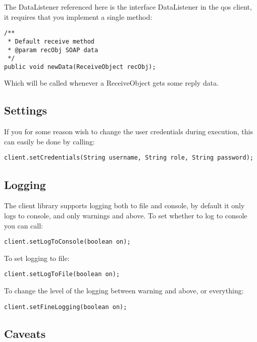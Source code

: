 The DataListener referenced here is the interface DataListener in the qos client, it requires that you implement a single method:

\begin{lstlisting}[caption={The DataListener interface}, label=userguideDatalistener]
/**
 * Default receive method
 * @param recObj SOAP data
 */
public void newData(ReceiveObject recObj);
\end{lstlisting}

Which will be called whenever a ReceiveObject gets some reply data.

\subsection{Settings}\label{userguideSettings}
If you for some reason wish to change the user credentials during execution, this can easily be done by calling:
\begin{lstlisting}[caption={Changing user credentials}, label=userguideCredentials]
    client.setCredentials(String username, String role, String password);
\end{lstlisting}

\subsection{Logging}\label{userguideLogging}
The client library supports logging both to file and console, by default it only logs to console, and only warnings and above.
To set whether to log to console you can call:
\begin{lstlisting}[caption={Turn logging to console on or off}, label=userguideTogglelogtoconsole]
    client.setLogToConsole(boolean on);
\end{lstlisting}
To set logging to file:
\begin{lstlisting}[caption={Turn logging to file on or off}, label=userguideTogglelogtofile]
    client.setLogToFile(boolean on);
\end{lstlisting}
To change the level of the logging between warning and above, or everything:
\begin{lstlisting}[caption={Switch between the two logging scopes}, label=userguideToggleloggingdetails]
    client.setFineLogging(boolean on);
\end{lstlisting}

\subsection{Caveats}\label{userguideCaveats}
